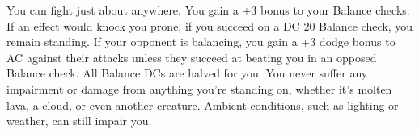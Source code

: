 {You can fight just about anywhere.}
{You gain a +3 bonus to your Balance checks.}
{If an effect would knock you prone, if you succeed on a DC 20 Balance check, you remain standing.}
{If your opponent is balancing, you gain a +3 dodge bonus to AC against their attacks unless they succeed at beating you in an opposed Balance check.}
{All Balance DCs are halved for you.}
{You never suffer any impairment or damage from anything you're standing on, whether it's molten lava, a cloud, or even another creature. Ambient conditions, such as lighting or weather, can still impair you.}